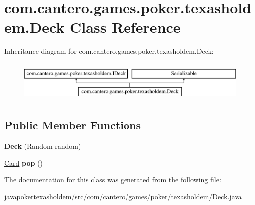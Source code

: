 \hypertarget{classcom_1_1cantero_1_1games_1_1poker_1_1texasholdem_1_1_deck}{}\section{com.\+cantero.\+games.\+poker.\+texasholdem.\+Deck Class Reference}
\label{classcom_1_1cantero_1_1games_1_1poker_1_1texasholdem_1_1_deck}
Inheritance diagram for com.\+cantero.\+games.\+poker.\+texasholdem.\+Deck\+:\begin{figure}[H]
\begin{center}
\leavevmode
\includegraphics[height=2.000000cm]{classcom_1_1cantero_1_1games_1_1poker_1_1texasholdem_1_1_deck}
\end{center}
\end{figure}
\subsection*{Public Member Functions}
\begin{DoxyCompactItemize}
\item 
\hypertarget{classcom_1_1cantero_1_1games_1_1poker_1_1texasholdem_1_1_deck_a3d0f96efe0d2b1b801c7038bf59e00a2}{}{\bfseries Deck} (Random random)\label{classcom_1_1cantero_1_1games_1_1poker_1_1texasholdem_1_1_deck_a3d0f96efe0d2b1b801c7038bf59e00a2}

\item 
\hypertarget{classcom_1_1cantero_1_1games_1_1poker_1_1texasholdem_1_1_deck_aef9b53c78401255d5c39bfac2a64906d}{}\hyperlink{classcom_1_1cantero_1_1games_1_1poker_1_1texasholdem_1_1_card}{Card} {\bfseries pop} ()\label{classcom_1_1cantero_1_1games_1_1poker_1_1texasholdem_1_1_deck_aef9b53c78401255d5c39bfac2a64906d}

\end{DoxyCompactItemize}


The documentation for this class was generated from the following file\+:\begin{DoxyCompactItemize}
\item 
javapokertexasholdem/src/com/cantero/games/poker/texasholdem/Deck.\+java\end{DoxyCompactItemize}
